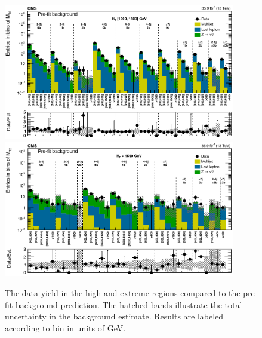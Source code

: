 \begin{figure}
	\centering
	\includegraphics[width=0.90\textwidth]{results/figs/mt2_highHT_fullEstimate}
	\includegraphics[width=0.90\textwidth]{results/figs/mt2_extremeHT_fullEstimate}
	\renewcommand{\baselinestretch}{1.0}
	\caption[The data yield in the high \HT and extreme \HT regions compared to the pre-fit background prediction.]{The data yield in the high \HT and extreme \HT regions compared to the pre-fit background prediction. The hatched bands illustrate the total uncertainty in the background estimate. Results are labeled according to \mttwo bin in units of GeV.}
	\label{fig:yieldPrefit3}
\end{figure}

